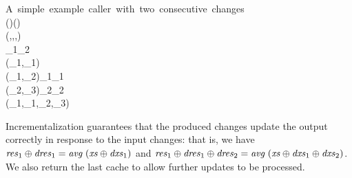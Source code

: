 \begin{hscode}\SaveRestoreHook
{}%
%
%
%
%
%
\>[B]{}\mbox{\onelinecomment  A simple example caller with two consecutive changes}{}\<[E]%
\\
\>[B]{}\mathrel{:\mkern-1mu:}\;\to \Delta (\;)\to \Delta (\;)\to {}\<[E]%
\\
\>[B]{}\<[3]%
\>[3]{}(,\Delta {},\Delta {},){}\<[E]%
\\
\>[B]{}\;\;_{1}\;_{2}\mathrel{=}{}\<[E]%
\\
\>[B]{}\<[3]%
\>[3]{}\;{}\<[8]%
\>[8]{}(_{1},{}\<[17]%
\>[17]{}_{1})\mathrel{=}\;{}\<[34]%
\>[34]{}\<[E]%
\\
\>[8]{}(_{1},{}\<[17]%
\>[17]{}_{2})\mathrel{=}\;{}\<[34]%
\>[34]{}_{1}\;_{1}{}\<[E]%
\\
\>[8]{}(_{2},{}\<[17]%
\>[17]{}_{3})\mathrel{=}\;{}\<[34]%
\>[34]{}_{2}\;_{2}{}\<[E]%
\\
\>[B]{}\<[3]%
\>[3]{}\;{}\<[8]%
\>[8]{}(_{1},_{1},_{2},_{3}){}\<[E]%
\ColumnHook
\end{hscode}\resethooks
Incrementalization guarantees that the produced changes update the output
correctly in response to the input changes: that is, we have \ensuremath{\Varid{res}_{1}\oplus \Varid{dres}_{1}\mathrel{=}\Varid{avg}\;(\Varid{xs}\oplus \Varid{dxs}_{1})} and \ensuremath{\Varid{res}_{1}\oplus \Varid{dres}_{1}\oplus \Varid{dres}_{2}\mathrel{=}\Varid{avg}\;(\Varid{xs}\oplus \Varid{dxs}_{1}\oplus \Varid{dxs}_{2})}. We also return the last cache to allow further updates to
be processed.

